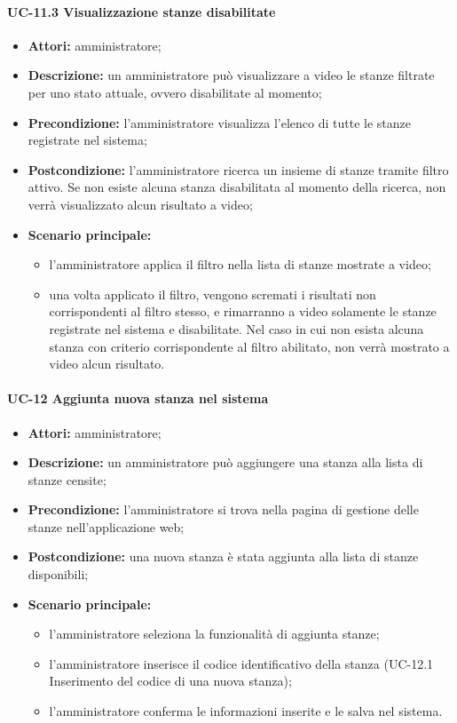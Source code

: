 \paragraph{UC-11.3 Visualizzazione stanze disabilitate}
\begin{itemize}
    \item \textbf{Attori:} amministratore;
    \item \textbf{Descrizione:} un amministratore pu\`{o} visualizzare a video le stanze filtrate per uno stato attuale, ovvero disabilitate al momento;
    \item \textbf{Precondizione:} l'amministratore visualizza l'elenco di tutte le stanze registrate nel sistema;
    \item \textbf{Postcondizione:} l'amministratore ricerca un insieme di stanze tramite filtro attivo. Se non esiste alcuna stanza disabilitata al momento della ricerca, non verrà visualizzato alcun risultato a video;
    \item \textbf{Scenario principale:}
    \begin{itemize}
        \item l'amministratore applica il filtro nella lista di stanze mostrate a video;
        \item una volta applicato il filtro, vengono scremati i risultati non corrispondenti al filtro stesso, e rimarranno a video solamente le stanze registrate nel sistema e disabilitate. Nel caso in cui non esista alcuna stanza con criterio corrispondente al filtro abilitato, non verrà mostrato a video alcun risultato.
    \end{itemize}
\end{itemize}


\paragraph{UC-12 Aggiunta nuova stanza nel sistema}
\begin{itemize}
    \item \textbf{Attori:} amministratore;
    \item \textbf{Descrizione:} un amministratore pu\`{o} aggiungere una stanza alla lista di stanze censite;
    \item \textbf{Precondizione:} l'amministratore si trova nella pagina di gestione delle stanze nell'applicazione web;
    \item \textbf{Postcondizione:} una nuova stanza \`{e} stata aggiunta alla lista di stanze disponibili;
    \item \textbf{Scenario principale:}
    \begin{itemize}
        \item l'amministratore seleziona la funzionalità di aggiunta stanze;
        \item l'amministratore inserisce il codice identificativo della stanza (UC-12.1 Inserimento del codice di una nuova stanza);
        \item l'amministratore conferma le informazioni inserite e le salva nel sistema.
    \end{itemize}
\end{itemize}


